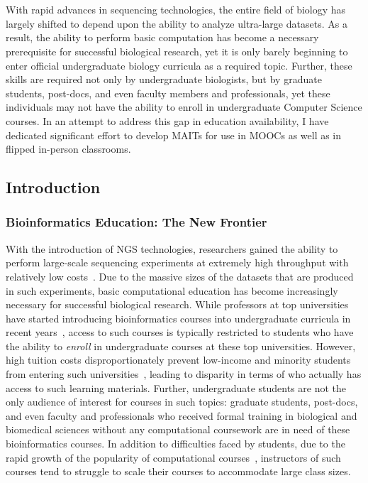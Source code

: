 \chapter{\educationtitle}
\label{chap:education}
\clearpage

With rapid advances in sequencing technologies, the entire field of biology has largely shifted to depend upon the ability to analyze ultra-large datasets. As a result, the ability to perform basic computation has become a necessary prerequisite for successful biological research, yet it is only barely beginning to enter official undergraduate biology curricula as a required topic. Further, these skills are required not only by undergraduate biologists, but by graduate students, post-docs, and even faculty members and professionals, yet these individuals may not have the ability to enroll in undergraduate Computer Science courses. In an attempt to address this gap in education availability, I have dedicated significant effort to develop \glspl{MAIT} for use in \glspl{MOOC} as well as in flipped in-person classrooms.

\section{Introduction}
\subsection{Bioinformatics Education: The New Frontier}
With the introduction of \gls{NGS} technologies, researchers gained the ability to perform large-scale sequencing experiments at extremely high throughput with relatively low costs~\cite{Metzker2010}. Due to the massive sizes of the datasets that are produced in such experiments, basic computational education has become increasingly necessary for successful biological research. While professors at top universities have started introducing bioinformatics courses into undergraduate curricula in recent years~\cite{Compeau2019,Mulder2018,Madlung2018}, access to such courses is typically restricted to students who have the ability to \textit{enroll} in undergraduate courses at these top universities. However, high tuition costs disproportionately prevent low-income and minority students from entering such universities~\cite{Wetzel1998}, leading to disparity in terms of who actually has access to such learning materials. Further, undergraduate students are not the only audience of interest for courses in such topics: graduate students, post-docs, and even faculty and professionals who received formal training in biological and biomedical sciences without any computational coursework are in need of these bioinformatics courses. In addition to difficulties faced by students, due to the rapid growth of the popularity of computational courses~\cite{Camp2017}, instructors of such courses tend to struggle to scale their courses to accommodate large class sizes.

